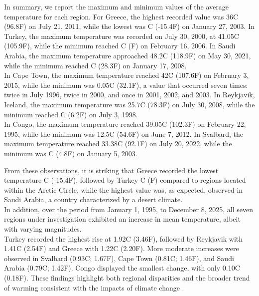 \documentclass[12pt]{Definitions/academia}
\begin{document}
In summary, we report the maximum and minimum values of the average
temperature for each region. For Greece, the highest recorded value
was 36\textdegree C (96.8\textdegree F) on July 21, 2011, while the lowest was \textdegree C
(-15.4\textdegree F) on January 27, 2003. In Turkey, the maximum temperature
was recorded on July 30, 2000, at 41.05\textdegree C (105.9\textdegree F), while the minimum
reached \textdegree C (\textdegree F) on February 16, 2006.
In Saudi Arabia, the maximum temperature approached 48.2\textdegree C (118.9\textdegree F)
on May 30, 2021, while the minimum reached \textdegree C (28.3\textdegree F)
on January 17, 2008.\\ In Cape Town, the maximum temperature reached
42\textdegree C (107.6\textdegree F) on February 3, 2015, while the minimum was 0.05\textdegree C (32.1\textdegree F),
a value that occurred seven times: twice in July 1996, twice in 2000,
and once in 2001, 2002, and 2003. In Reykjavik, Iceland, the maximum
temperature was 25.7\textdegree C (78.3\textdegree F) on July 30, 2008, while the minimum
reached \textdegree C (6.2\textdegree F) on July 3, 1998.\\
 In Congo, the maximum
temperature reached 39.05\textdegree C (102.3\textdegree F) on February 22, 1995, while
the minimum was 12.5\textdegree C (54.6\textdegree F) on June 7, 2012. In Svalbard, the
maximum temperature reached 33.38\textdegree C (92.1\textdegree F) on July 20, 2022, while
the minimum was \textdegree C (4.8\textdegree F) on January 5, 2003.

From these observations, it is striking that Greece recorded the lowest
temperature \textdegree C (-15.4\textdegree F), followed by Turkey \textdegree C
(\textdegree F) compared to regions located within the Arctic Circle,
while the highest value was, as expected, observed in Saudi Arabia,
a country characterized by a desert climate.\\
 In addition, over the
period from January 1, 1995, to December 8, 2025, all seven regions
under investigation exhibited an increase in mean temperature, albeit
with varying magnitudes.\\
 Turkey recorded the highest rise at 1.92\textdegree C
(3.46\textdegree F), followed by Reykjavik with 1.41\textdegree C (2.54\textdegree F) and Greece with
1.22\textdegree C (2.20\textdegree F). More moderate increases were observed in Svalbard
(0.93\textdegree C; 1.67\textdegree F), Cape Town (0.81\textdegree C; 1.46\textdegree F), and Saudi Arabia (0.79\textdegree C;
1.42\textdegree F). Congo displayed the smallest change, with only 0.10\textdegree C (0.18\textdegree F).
These findings highlight both regional disparities and the broader
trend of warming consistent with the impacts of climate change .
\end{document}
